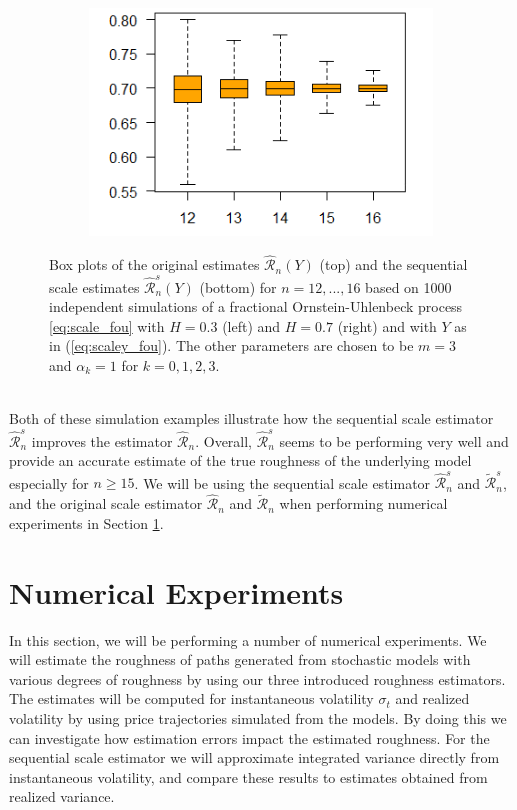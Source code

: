 \documentclass{article}
\begin{document}
\begin{figure}[htbp]
\begin{subfigure}{0.48\textwidth}
    \end{subfigure}
    \hfill
    \begin{subfigure}{0.48\textwidth}
        \includegraphics[width=\linewidth]{07fou_scale.png}
    \end{subfigure}
    
    \caption{Box plots of the original estimates $\hat{\mathscr{R}}_n (Y)$ (top) and the sequential scale estimates $\hat{\mathscr{R}}_n^s (Y)$ (bottom) for $n=12,...,16$ based on 1000 independent simulations of a fractional Ornstein-Uhlenbeck process \eqref{eq:scale_fou} with $H=0.3$ (left) and $H=0.7$ (right) and with $Y$ as in (\ref{eq:scaley_fou}). The other parameters are chosen to be $m=3$ and $\alpha_k = 1$ for $k=0,1,2,3$.} \label{fig:scaleplot_fou}
\end{figure}\\
Both of these simulation examples illustrate how the sequential scale estimator $\widehat{\mathscr{R}}_n^s$ improves the estimator $\widehat{\mathscr{R}}_n$. Overall, $\widehat{\mathscr{R}}_n^s$ seems to be performing very well and provide an accurate estimate of the true roughness of the underlying model especially for $n\geq 15$. We will be using the sequential scale estimator $\widehat{\mathscr{R}}_n^s$ and $\widetilde{\mathscr{R}}_n^s$, and the original scale estimator $\widehat{\mathscr{R}}_n$ and $\widetilde{\mathscr{R}}_n$ when performing numerical experiments in Section \ref{sec:num_exp}.

\section{Numerical Experiments} \label{sec:num_exp}
In this section, we will be performing a number of numerical experiments. We will estimate the roughness of paths generated from stochastic models with various degrees of roughness by using our three introduced roughness estimators. The estimates will be computed for instantaneous volatility $\sigma_t$ and realized volatility by using price trajectories simulated from the models. By doing this we can investigate how estimation errors impact the estimated roughness. For the sequential scale estimator we will approximate integrated variance directly from instantaneous volatility, and compare these results to estimates obtained from realized variance.
\end{document}

